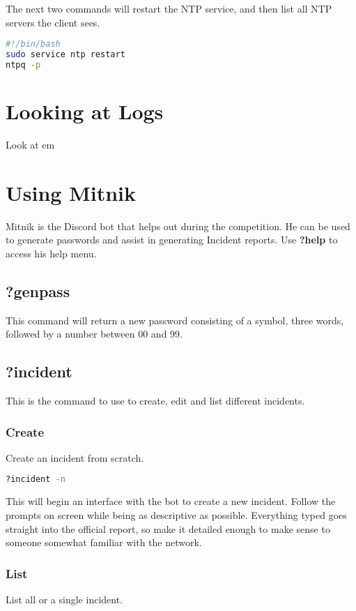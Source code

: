 \documentclass{article}
\begin{document}
The next two commands will restart the NTP service, and then list all NTP servers the client sees.

\begin{lstlisting}[language=bash]
#!/bin/bash
sudo service ntp restart
ntpq -p
\end{lstlisting}


\section{Looking at Logs}
Look at em

\section{Using Mitnik}
Mitnik is the Discord bot that helps out during the competition. He can be used to generate passwords and assist in generating Incident reports. Use \textbf{?help} to access his help menu.

\subsection{?genpass}
This command will return a new password consisting of a symbol, three words, followed by a number between 00 and 99. 

\subsection{?incident}
This is the command to use to create, edit and list different incidents.

\subsubsection{Create}
Create an incident from scratch.

\begin{lstlisting}[language=bash]
?incident -n
\end{lstlisting}

This will begin an interface with the bot to create a new incident. Follow the prompts on screen while being as descriptive as possible. Everything typed goes straight into the official report, so make it detailed enough to make sense to someone somewhat familiar with the network. 

\subsubsection{List}
List all or a single incident.
\end{document}
